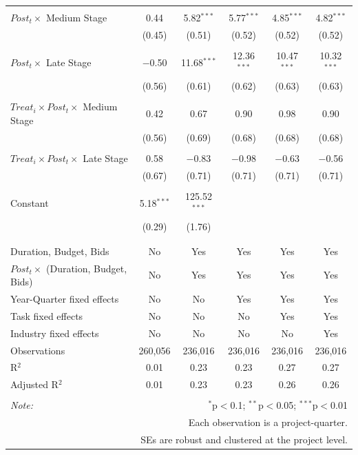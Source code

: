 \documentclass[
]{article}
\begin{document}
\begin{table}[H]
\begin{tabular}{@{\extracolsep{-2pt}}lccccc}
  & & & & & \\ 
 $Post_t \times$ Medium Stage & 0.44 & 5.82$^{***}$ & 5.77$^{***}$ & 4.85$^{***}$ & 4.82$^{***}$ \\ 
  & (0.45) & (0.51) & (0.52) & (0.52) & (0.52) \\ 
  & & & & & \\ 
 $Post_t \times$ Late Stage & $-$0.50 & 11.68$^{***}$ & 12.36$^{***}$ & 10.47$^{***}$ & 10.32$^{***}$ \\ 
  & (0.56) & (0.61) & (0.62) & (0.63) & (0.63) \\ 
  & & & & & \\ 
 $Treat_i \times Post_t \times$ Medium Stage & 0.42 & 0.67 & 0.90 & 0.98 & 0.90 \\ 
  & (0.56) & (0.69) & (0.68) & (0.68) & (0.68) \\ 
  & & & & & \\ 
 $Treat_i \times Post_t \times$ Late Stage & 0.58 & $-$0.83 & $-$0.98 & $-$0.63 & $-$0.56 \\ 
  & (0.67) & (0.71) & (0.71) & (0.71) & (0.71) \\ 
  & & & & & \\ 
 Constant & 5.18$^{***}$ & 125.52$^{***}$ &  &  &  \\ 
  & (0.29) & (1.76) &  &  &  \\ 
  & & & & & \\ 
\hline \\[-1.8ex] 
Duration, Budget, Bids & No & Yes & Yes & Yes & Yes \\ 
$Post_t \times $  (Duration, Budget, Bids) & No & Yes & Yes & Yes & Yes \\ 
Year-Quarter fixed effects & No & No & Yes & Yes & Yes \\ 
Task fixed effects & No & No & No & Yes & Yes \\ 
Industry fixed effects & No & No & No & No & Yes \\ 
Observations & 260,056 & 236,016 & 236,016 & 236,016 & 236,016 \\ 
R$^{2}$ & 0.01 & 0.23 & 0.23 & 0.27 & 0.27 \\ 
Adjusted R$^{2}$ & 0.01 & 0.23 & 0.23 & 0.26 & 0.26 \\ 
\hline 
\hline \\[-1.8ex] 
\textit{Note:}  & \multicolumn{5}{r}{$^{*}$p$<$0.1; $^{**}$p$<$0.05; $^{***}$p$<$0.01} \\ 
 & \multicolumn{5}{r}{Each observation is a project-quarter.} \\ 
 & \multicolumn{5}{r}{SEs are robust and clustered at the project level.} \\ 
\end{tabular} 
\end{table}
\end{document}
